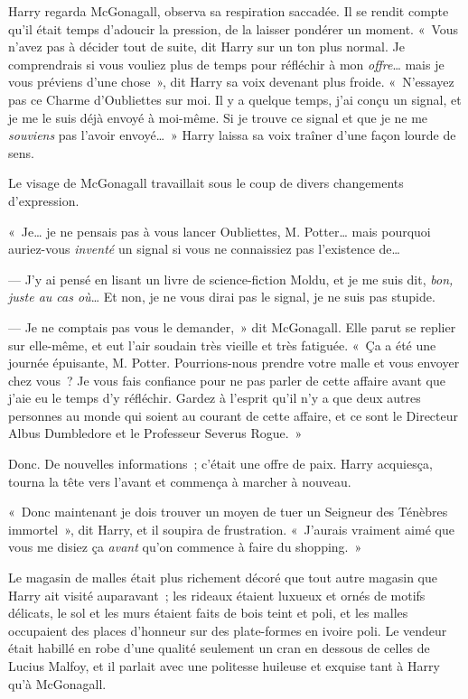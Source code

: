 Harry regarda McGonagall, observa sa respiration saccadée. Il se rendit compte qu'il était temps d'adoucir la pression, de la laisser pondérer un moment. «~Vous n'avez pas à décider tout de suite, dit Harry sur un ton plus normal. Je comprendrais si vous vouliez plus de temps pour réfléchir à mon \emph{offre}… mais je vous préviens d'une chose~», dit Harry sa voix devenant plus froide. «~N'essayez pas ce Charme d'Oubliettes sur moi. Il y a quelque temps, j'ai conçu un signal, et je me le suis déjà envoyé à moi-même. Si je trouve ce signal et que je ne me \emph{souviens} pas l'avoir envoyé…~» Harry laissa sa voix traîner d'une façon lourde de sens.

Le visage de McGonagall travaillait sous le coup de divers changements d'expression.

«~Je… je ne pensais pas à vous lancer Oubliettes, M. Potter… mais pourquoi auriez-vous \emph{inventé} un signal si vous ne connaissiez pas l'existence de…

--- J'y ai pensé en lisant un livre de science-fiction Moldu, et je me suis dit, \emph{bon, juste au cas où}… Et non, je ne vous dirai pas le signal, je ne suis pas stupide.

--- Je ne comptais pas vous le demander,~» dit McGonagall. Elle parut se replier sur elle-même, et eut l'air soudain très vieille et très fatiguée. «~Ça a été une journée épuisante, M. Potter. Pourrions-nous prendre votre malle et vous envoyer chez vous~? Je vous fais confiance pour ne pas parler de cette affaire avant que j'aie eu le temps d'y réfléchir. Gardez à l'esprit qu'il n'y a que deux autres personnes au monde qui soient au courant de cette affaire, et ce sont le Directeur Albus Dumbledore et le Professeur Severus Rogue.~»

Donc. De nouvelles informations~; c'était une offre de paix. Harry acquiesça, tourna la tête vers l'avant et commença à marcher à nouveau.

«~Donc maintenant je dois trouver un moyen de tuer un Seigneur des Ténèbres immortel~», dit Harry, et il soupira de frustration. «~J'aurais vraiment aimé que vous me disiez ça \emph{avant} qu'on commence à faire du shopping.~»

\later

Le magasin de malles était plus richement décoré que tout autre magasin que Harry ait visité auparavant~; les rideaux étaient luxueux et ornés de motifs délicats, le sol et les murs étaient faits de bois teint et poli, et les malles occupaient des places d'honneur sur des plate-formes en ivoire poli. Le vendeur était habillé en robe d'une qualité seulement un cran en dessous de celles de Lucius Malfoy, et il parlait avec une politesse huileuse et exquise tant à Harry qu'à McGonagall.

